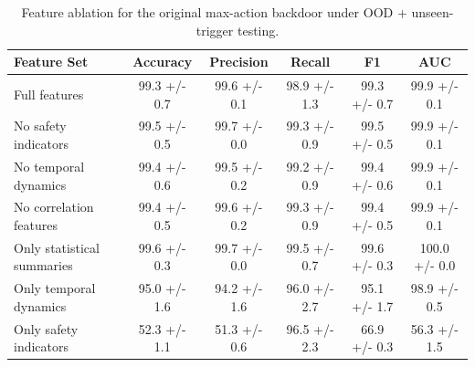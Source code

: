 \begin{table}[t]
\centering
\begin{tabular}{lccccc}
\hline
Feature Set & Accuracy & Precision & Recall & F1 & AUC \\
\hline
Full features & 99.3 +/- 0.7 & 99.6 +/- 0.1 & 98.9 +/- 1.3 & 99.3 +/- 0.7 & 99.9 +/- 0.1 \\
No safety indicators & 99.5 +/- 0.5 & 99.7 +/- 0.0 & 99.3 +/- 0.9 & 99.5 +/- 0.5 & 99.9 +/- 0.1 \\
No temporal dynamics & 99.4 +/- 0.6 & 99.5 +/- 0.2 & 99.2 +/- 0.9 & 99.4 +/- 0.6 & 99.9 +/- 0.1 \\
No correlation features & 99.4 +/- 0.5 & 99.6 +/- 0.2 & 99.3 +/- 0.9 & 99.4 +/- 0.5 & 99.9 +/- 0.1 \\
Only statistical summaries & 99.6 +/- 0.3 & 99.7 +/- 0.0 & 99.5 +/- 0.7 & 99.6 +/- 0.3 & 100.0 +/- 0.0 \\
Only temporal dynamics & 95.0 +/- 1.6 & 94.2 +/- 1.6 & 96.0 +/- 2.7 & 95.1 +/- 1.7 & 98.9 +/- 0.5 \\
Only safety indicators & 52.3 +/- 1.1 & 51.3 +/- 0.6 & 96.5 +/- 2.3 & 66.9 +/- 0.3 & 56.3 +/- 1.5 \\
\hline
\end{tabular}
\caption{Feature ablation for the original max-action backdoor under OOD + unseen-trigger testing.}
\label{tab:feature_ablation_robustness}
\end{table}
